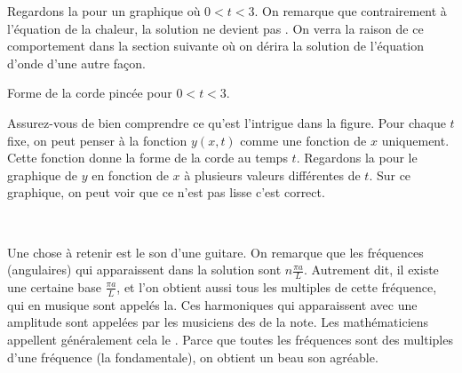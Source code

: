 \begin{example}
Regardons la 
 pour un graphique où
 $0 < t < 3$.  On remarque 
que contrairement à l'équation de la chaleur,  la solution ne devient pas
.  On verra la raison de ce comportement dans la
section suivante où on dérira la solution de l'équation d'onde d'une autre
façon.

\begin{myfig}
\capstart
{}
\caption{Forme de la corde pincée pour $0 < t < 3$.\label{wave:pluckedexfig}}
\end{myfig}

Assurez-vous de bien comprendre ce qu'est l'intrigue dans la figure.  Pour chaque $ t $ fixe,  on peut penser à la fonction
$ y (x, t) $ comme une fonction de $ x $ uniquement.  Cette fonction donne la forme de la corde
au temps $ t $.  Regardons la   pour le graphique de $ y $ en fonction de $ x $ à plusieurs valeurs différentes de $ t $.
Sur ce graphique,  on peut voir que ce n'est pas lisse c'est correct.  

\begin{myfig}
\capstart
\\[5pt]
\caption{La corde pincée pour $t=0$, $t=0.4$, $t=0.8$,  et
$t=1.2$.%
\label{wave:pluckedtsfig}}
\end{myfig}
\end{example}

Une chose à retenir est le son d'une guitare.  On remarque que
les fréquences (angulaires) qui apparaissent dans la solution sont
$n \frac{\pi a}{L}$.  Autrement dit, il existe une certaine base
\emph{} $\frac{\pi a}{L}$,  et l'on obtient aussi
tous les multiples de cette fréquence,  qui en musique sont appelés
la\emph{}.  Ces harmoniques qui apparaissent avec une amplitude sont 
appelées par les musiciens des  \emph{} de la note.
Les mathématiciens appellent généralement cela le \emph{}.
Parce que toutes les fréquences sont des multiples d'une fréquence (la fondamentale),
on obtient un beau son agréable.

